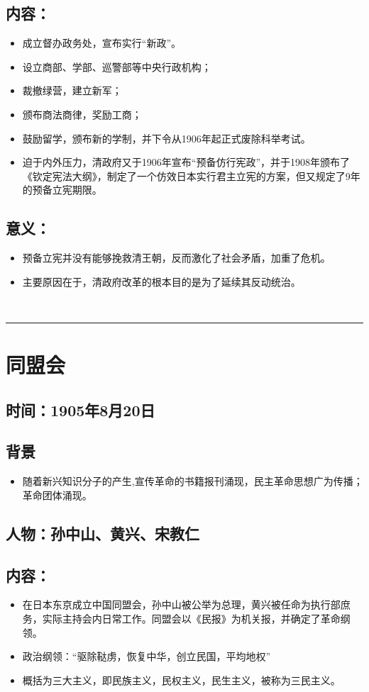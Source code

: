 \documentclass{article}
\begin{document}
\subsection*{内容：}
\begin{itemize}
    \item 成立督办政务处，宣布实行``新政''。
    \item 设立商部、学部、巡警部等中央行政机构；
    \item 裁撤绿营，建立新军；
    \item 颁布商法商律，奖励工商；
    \item 鼓励留学，颁布新的学制，并下令从1906年起正式废除科举考试。
    \item 迫于内外压力，清政府又于1906年宣布``预备仿行宪政''，并于1908年颁布了《钦定宪法大纲》，制定了一个仿效日本实行君主立宪的方案，但又规定了9年的预备立宪期限。
\end{itemize}
\subsection*{意义：}
\begin{itemize}
    \item 预备立宪并没有能够挽救清王朝，反而激化了社会矛盾，加重了危机。
    \item 主要原因在于，清政府改革的根本目的是为了延续其反动统治。
\end{itemize}
\ \hrule

\section*{同盟会}
\subsection*{时间：1905年8月20日}
\subsection*{背景}
\begin{itemize}
	\item 随着新兴知识分子的产生,宣传革命的书籍报刊涌现，民主革命思想广为传播；革命团体涌现。
\end{itemize}
\subsection*{人物：孙中山、黄兴、宋教仁}
\subsection*{内容：}
\begin{itemize}
    \item 在日本东京成立中国同盟会，孙中山被公举为总理，黄兴被任命为执行部庶务，实际主持会内日常工作。同盟会以《民报》为机关报，并确定了革命纲领。
    \item 政治纲领：``驱除鞑虏，恢复中华，创立民国，平均地权''
    \item 概括为三大主义，即民族主义，民权主义，民生主义，被称为三民主义。
\end{itemize}
\end{document}
